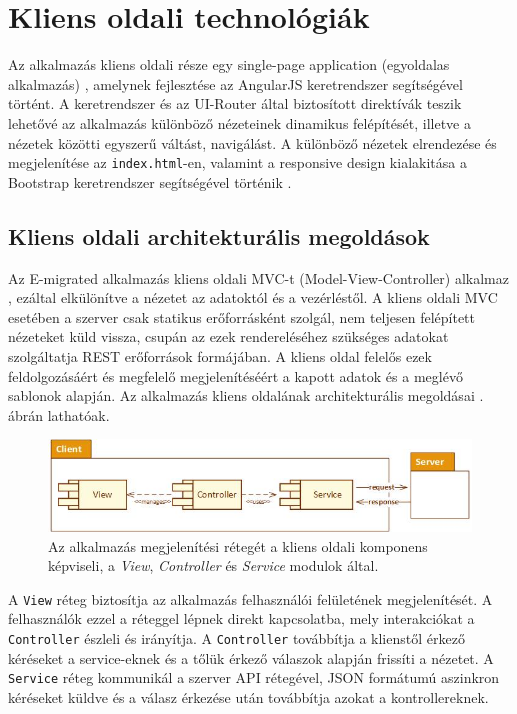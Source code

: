 \chapter{Kliens oldali technológiák}\label{ch:kliens}

\begin{osszefoglal}Az alkalmazás kliens oldali része egy single-page application (egyoldalas alkalmazás) \cite{SPA}, amelynek fejlesztése az AngularJS keretrendszer segítségével történt. A keretrendszer és az UI-Router által biztosított direktívák teszik lehetővé az alkalmazás különböző nézeteinek dinamikus felépítését, illetve a nézetek közötti egyszerű váltást, navigálást. A különböző nézetek elrendezése és megjelenítése az \texttt{index.html}-en, valamint a responsive design kialakitása a Bootstrap keretrendszer segítségével történik \cite{Bootstrap}.
\end{osszefoglal}

\section{Kliens oldali architekturális megoldások}
Az E-migrated alkalmazás kliens oldali MVC-t (Model-View-Controller) alkalmaz \cite{WebMVC}, ezáltal elkülönítve a nézetet az adatoktól és a vezérléstől. A kliens oldali MVC esetében a szerver csak statikus erőforrásként szolgál, nem teljesen felépített nézeteket küld vissza, csupán az ezek rendereléséhez szükséges adatokat szolgáltatja REST erőforrások formájában. A kliens oldal felelős ezek feldolgozásáért és megfelelő megjelenítéséért a kapott adatok és a meglévő sablonok alapján.
Az alkalmazás kliens oldalának architekturális megoldásai . ábrán lathatóak. 

\begin{figure}
  \centering
  \includegraphics[width=0.9\linewidth]{images/ClientArchitecture}
  \caption{Az alkalmazás megjelenítési rétegét a kliens oldali komponens képviseli, a \textit{View}, \textit{Controller} és \textit{Service} modulok által. }
  \label{fig:ClientArchitecture}
\end{figure}

A \texttt{View} réteg biztosítja az alkalmazás felhasználói felületének megjelenítését. A felhasználók ezzel a réteggel lépnek direkt kapcsolatba, mely interakciókat a \texttt{Controller} észleli és irányítja. A \texttt{Controller} továbbítja a klienstől érkező kéréseket a service-eknek és a tőlük érkező válaszok alapján frissíti a nézetet. A \texttt{Service} réteg kommunikál a szerver API rétegével, JSON formátumú aszinkron kéréseket küldve és a válasz érkezése után továbbítja azokat a kontrollereknek. 

